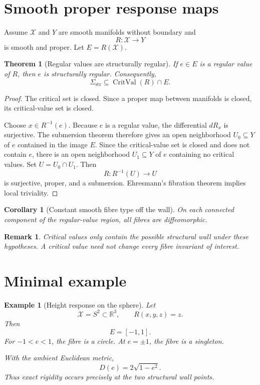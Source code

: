 \documentclass[11pt]{article}
\newtheorem{theorem}[definition]{Theorem}
\newtheorem{corollary}[definition]{Corollary}
\newtheorem{example}[definition]{Example}
\newtheorem{remark}[definition]{Remark}
\newcommand{\X}{\mathcal X}
\begin{document}
\section{Smooth proper response maps}

Assume \(\X\) and \(Y\) are smooth manifolds without boundary and
\[
R:\X\to Y
\]
is smooth and proper. Let \(E=R(\X)\).

\begin{theorem}[Regular values are structurally regular]
If \(e\in E\) is a regular value of \(R\), then \(e\) is structurally regular.
Consequently,
\[
\Sigma_{\mathrm{str}}
\subseteq
\operatorname{CritVal}(R)\cap E.
\]
\end{theorem}

\begin{proof}
The critical set is closed. Since a proper map between manifolds is closed,
its critical-value set is closed.

Choose \(x\in R^{-1}(e)\). Because \(e\) is a regular value, the
differential \(dR_x\) is surjective. The submersion theorem therefore gives
an open neighborhood \(U_0\subseteq Y\) of \(e\) contained in the image
\(E\). Since the critical-value set is closed and does not contain \(e\),
there is an open neighborhood \(U_1\subseteq Y\) of \(e\) containing no
critical values. Set \(U=U_0\cap U_1\). Then
\[
R:R^{-1}(U)\to U
\]
is surjective, proper, and a submersion. Ehresmann's fibration theorem implies
local triviality.
\end{proof}

\begin{corollary}[Constant smooth fibre type off the wall]
On each connected component of the regular-value region, all fibres are
diffeomorphic.
\end{corollary}

\begin{remark}
Critical values only contain the possible structural wall under these
hypotheses. A critical value need not change every fibre invariant of interest.
\end{remark}

\section{Minimal example}

\begin{example}[Height response on the sphere]
Let
\[
\X=S^2\subset\mathbb R^3,
\qquad
R(x,y,z)=z.
\]
Then
\[
E=[-1,1].
\]
For \(-1<e<1\), the fibre is a circle. At \(e=\pm1\), the fibre is a
singleton.

With the ambient Euclidean metric,
\[
D(e)=2\sqrt{1-e^2}.
\]
Thus exact rigidity occurs precisely at the two structural wall points.
\end{example}
\end{document}
